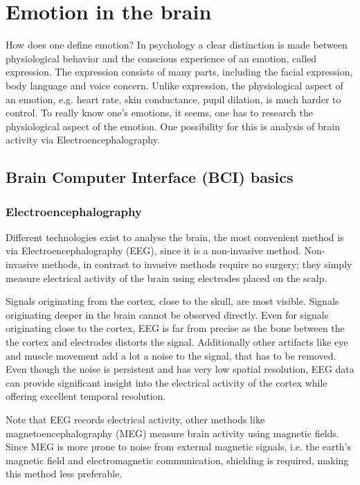 \chapter{Emotion in the brain}

How does one define emotion? In psychology a clear distinction is made between physiological behavior and the conscious experience of an emotion, called expression\cite{ExtendedPaper}. The expression consists of many parts, including the facial expression, body language and voice concern. Unlike expression, the physiological aspect of an emotion, e.g. heart rate, skin conductance, pupil dilation, is much harder to control. To really know one's emotions, it seems, one has to research the physiological aspect of the emotion. One possibility for this is analysis of brain activity via Electroencephalography\cite{EEGDatasets}.

\section{Brain Computer Interface (BCI) basics}

\subsection{Electroencephalography}
Different technologies exist to analyse the brain, the most convenient method is via Electroencephalography (EEG), since it is a non-invasive method. Non-invasive methods, in contrast to invasive methods require no surgery; they simply measure electrical activity of the brain using electrodes placed on the scalp.

\npar

Signals originating from the cortex, close to the skull, are most visible. Signals originating deeper in the brain cannot be observed directly. Even for signals originating close to the cortex, EEG is far from precise as the bone between the the cortex and electrodes distorts the signal. Additionally other artifacts like eye and muscle movement add a lot a noise to the signal, that has to be removed. Even though the noise is persistent and has very low spatial resolution, EEG data can provide significant insight into the electrical activity of the cortex while offering excellent temporal resolution\cite{GivenPaper}.

\npar

Note that EEG records electrical activity, other methods like magnetoencephalography (MEG) measure brain activity using magnetic fields. Since MEG is more prone to noise from external magnetic signals, i.e. the earth's magnetic field and electromagnetic communication, shielding is required, making this method less preferable.

